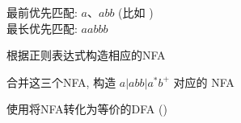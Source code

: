 
\begin{frame}{}

  \vspace{0.30cm}
  \begin{center}
  \end{center}
\end{frame}

\begin{frame}{}

  \vspace{0.60cm}
  \begin{center}
    最前优先匹配: $a$、$abb$ (比如 ) \\[10pt]
    最长优先匹配: $aabbb$
  \end{center}
\end{frame}

\begin{frame}{}
  \begin{center}
    根据正则表达式构造相应的NFA
  \end{center}

\end{frame}

\begin{frame}{}
  \begin{center}
    合并这三个NFA, 构造 $a | abb | a^{\ast}b^{+}$ 对应的 NFA
  \end{center}

\end{frame}

\begin{frame}{}
  \begin{center}
    使用将NFA转化为等价的DFA ()


    \vspace{0.30cm}
  \end{center}
\end{frame}

